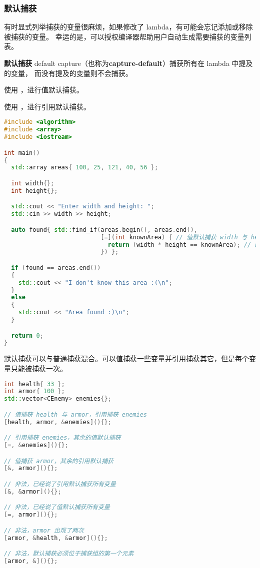 \documentclass[../../LearnCpp.tex]{subfiles}
\begin{document}
\subsubsection*{默认捕获}

有时显式列举捕获的变量很麻烦，如果修改了 lambda，有可能会忘记添加或移除被捕获的变量。
幸运的是，可以授权编译器帮助用户自动生成需要捕获的变量列表。

\textbf{默认捕获} default capture（也称为\textbf{capture-default}）捕获所有在 lambda 中提及的变量，
而没有提及的变量则不会捕获。

使用 \acode{=} ，进行值默认捕获。

使用 \acode{&} ，进行引用默认捕获。

\begin{lstlisting}[language=C++]
#include <algorithm>
#include <array>
#include <iostream>

int main()
{
  std::array areas{ 100, 25, 121, 40, 56 };

  int width{};
  int height{};

  std::cout << "Enter width and height: ";
  std::cin >> width >> height;

  auto found{ std::find_if(areas.begin(), areas.end(),
                           [=](int knownArea) { // 值默认捕获 width 与 height
                             return (width * height == knownArea); // 因为它们在这里被提及
                           }) };

  if (found == areas.end())
  {
    std::cout << "I don't know this area :(\n";
  }
  else
  {
    std::cout << "Area found :)\n";
  }

  return 0;
}
\end{lstlisting}

默认捕获可以与普通捕获混合。可以值捕获一些变量并引用捕获其它，但是每个变量只能被捕获一次。

\begin{lstlisting}[language=C++]
int health{ 33 };
int armor{ 100 };
std::vector<CEnemy> enemies{};

// 值捕获 health 与 armor，引用捕获 enemies
[health, armor, &enemies](){};

// 引用捕获 enemies，其余的值默认捕获
[=, &enemies](){};

// 值捕获 armor，其余的引用默认捕获
[&, armor](){};

// 非法，已经说了引用默认捕获所有变量
[&, &armor](){};

// 非法，已经说了值默认捕获所有变量
[=, armor](){};

// 非法，armor 出现了两次
[armor, &health, &armor](){};

// 非法，默认捕获必须位于捕获组的第一个元素
[armor, &](){};
\end{lstlisting}
\end{document}
